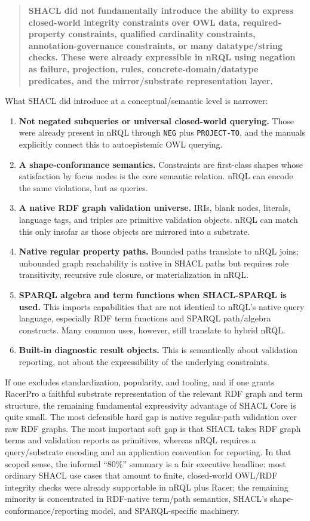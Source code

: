 \documentclass[11pt,letterpaper]{article}
\newcommand{\nrql}{nRQL}
\newcommand{\racer}{RacerPro}
\newcommand{\shacl}{SHACL}
\newcommand{\naf}{negation as failure}
\newcommand{\rdf}{RDF}
\newcommand{\owl}{OWL}
\begin{document}
\begin{quote}
\textbf{SHACL did not fundamentally introduce the ability to express closed-world integrity constraints over OWL data, required-property constraints, qualified cardinality constraints, annotation-governance constraints, or many datatype/string checks. These were already expressible in \nrql{} using \naf{}, projection, rules, concrete-domain/datatype predicates, and the mirror/substrate representation layer.}
\end{quote}

What \shacl{} did introduce at a conceptual/semantic level is narrower:

\begin{enumerate}[leftmargin=2em]
  \item \textbf{Not negated subqueries or universal closed-world querying.} Those were already present in \nrql{} through \texttt{NEG} plus \texttt{PROJECT-TO}, and the manuals explicitly connect this to autoepistemic \owl{} querying.
  \item \textbf{A shape-conformance semantics.} Constraints are first-class shapes whose satisfaction by focus nodes is the core semantic relation. \nrql{} can encode the same violations, but as queries.
  \item \textbf{A native \rdf{} graph validation universe.} IRIs, blank nodes, literals, language tags, and triples are primitive validation objects. \nrql{} can match this only insofar as those objects are mirrored into a substrate.
  \item \textbf{Native regular property paths.} Bounded paths translate to \nrql{} joins; unbounded graph reachability is native in \shacl{} paths but requires role transitivity, recursive rule closure, or materialization in \nrql{}.
  \item \textbf{SPARQL algebra and term functions when SHACL-SPARQL is used.} This imports capabilities that are not identical to \nrql{}'s native query language, especially RDF term functions and SPARQL path/algebra constructs. Many common uses, however, still translate to hybrid \nrql{}.
  \item \textbf{Built-in diagnostic result objects.} This is semantically about validation reporting, not about the expressibility of the underlying constraints.
\end{enumerate}

If one excludes standardization, popularity, and tooling, and if one grants \racer{} a faithful substrate representation of the relevant \rdf{} graph and term structure, the remaining fundamental expressivity advantage of \shacl{} Core is quite small. The most defensible hard gap is native regular-path validation over raw \rdf{} graphs. The most important soft gap is that \shacl{} takes \rdf{} graph terms and validation reports as primitives, whereas \nrql{} requires a query/substrate encoding and an application convention for reporting. In that scoped sense, the informal ``80\%'' summary is a fair executive headline: most ordinary \shacl{} use cases that amount to finite, closed-world OWL/RDF integrity checks were already supportable in \nrql{} plus Racer; the remaining minority is concentrated in RDF-native term/path semantics, SHACL's shape-conformance/reporting model, and SPARQL-specific machinery.
\end{document}
